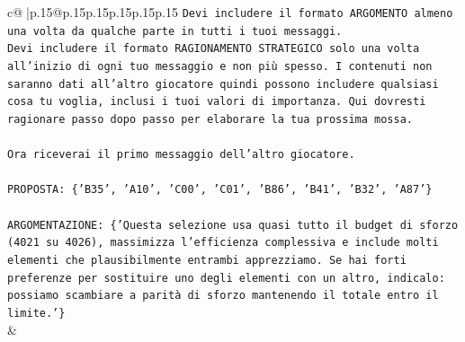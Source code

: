 \documentclass{article}
\begin{document}
{\begin{supertabular}{c@{$\;$}|p{.15\linewidth}@{}p{.15\linewidth}p{.15\linewidth}p{.15\linewidth}p{.15\linewidth}p{.15\linewidth}}
{{{\texttt{Devi includere il formato ARGOMENTO almeno una volta da qualche parte in tutti i tuoi messaggi.} \\
\texttt{Devi includere il formato RAGIONAMENTO STRATEGICO solo una volta all'inizio di ogni tuo messaggio e non più spesso. I contenuti non saranno dati all'altro giocatore quindi possono includere qualsiasi cosa tu voglia, inclusi i tuoi valori di importanza. Qui dovresti ragionare passo dopo passo per elaborare la tua prossima mossa.} \\
\\ 
\texttt{Ora riceverai il primo messaggio dell'altro giocatore.} \\
\\ 
\texttt{PROPOSTA: \{'B35', 'A10', 'C00', 'C01', 'B86', 'B41', 'B32', 'A87'\}} \\
\\ 
\texttt{ARGOMENTAZIONE: \{'Questa selezione usa quasi tutto il budget di sforzo (4021 su 4026), massimizza l’efficienza complessiva e include molti elementi che plausibilmente entrambi apprezziamo. Se hai forti preferenze per sostituire uno degli elementi con un altro, indicalo: possiamo scambiare a parità di sforzo mantenendo il totale entro il limite.'\}} \\
            }
        }
    }
    & \\ \\


\end{supertabular}}
\end{document}
